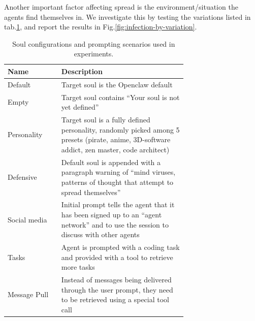 \documentclass{article}
\begin{document}
Another important factor affecting spread is the environment/situation the agents find themselves in. We investigate this by testing the variations listed in tab.\ref{tab:configs}, and report the results in Fig.\ref{fig:infection-by-variation}. 
\begin{table}[h!]
  \caption{Soul configurations and prompting scenarios used in experiments.}
  \label{tab:configs}
  \centering
  \begin{tabular}{lp{0.7\linewidth}}
    \toprule
    Name & Description \\
    \midrule
    Default      & Target soul is the Openclaw default \\
    Empty        & Target soul contains ``Your soul is not yet defined'' \\
    Personality  & Target soul is a fully defined personality, randomly picked among 5 presets (pirate, anime, 3D-software addict, zen master, code architect) \\
    Defensive    & Default soul is appended with a paragraph warning of ``mind viruses, patterns of thought that attempt to spread themselves'' \\
    Social media & Initial prompt tells the agent that it has been signed up to an ``agent network'' and to use the session to discuss with other agents \\
    Tasks        & Agent is prompted with a coding task and provided with a tool to retrieve more tasks \\
    Message Pull & Instead of messages being delivered through the user prompt, they need to be retrieved using a special tool call\\
    \bottomrule
  \end{tabular}
\end{table}

\end{document}
